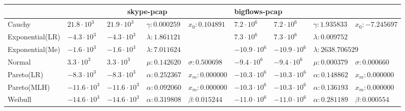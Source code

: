 \begin{table}[h!]
{\begin{tabular}{lllllllll}
				& \multicolumn{4}{c}{skype-pcap}                                        & \multicolumn{4}{l}{bigflows-pcap}                                       \\ \hline
Cauchy          & $ 21.8\cdot10^3 $  & $21.9\cdot10^3$  & $\gamma:0.000259 $ & $x_0:0.104891 $    & $ 7.2\cdot10^6 $   & $7.2\cdot10^6$   & $ \gamma:1.935833 $ & $x_0:-7.245697 $    \\
Exponential(LR) & $-4.3\cdot10^3$  & $ -4.3\cdot10^3 $  & \multicolumn{2}{l}{$\lambda:1.861121 $}   & $7.3\cdot10^6$   & $7.3\cdot10^6$   & \multicolumn{2}{l}{$ \lambda:0.009752 $}    \\
Exponential(Me) & $-1.6\cdot10^3$  & $-1.6\cdot10^3$  & \multicolumn{2}{l}{$\lambda:7.011624 $}   & $-10.9\cdot10^6$ & $-10.9\cdot10^6$ & \multicolumn{2}{l}{$ \lambda:2638.706529 $} \\
Normal          & $3.3\cdot10^3$   & $3.3\cdot10^3$   & $\mu:0.142620 $    & $\sigma:0.500698 $ & $-9.4\cdot10^6$  & $-9.4\cdot10^6$  & $ \mu:0.000379$     & $ \sigma:0.000660 $ \\
Pareto(LR)      & $-8.3\cdot10^3$  & $-8.3\cdot10^3$  & $\alpha:0.252367 $ & $x_m:0.000000 $    & $-10.3\cdot10^6$  & $-10.3\cdot10^6$  & $ \alpha:0.148862 $ & $ x_m:0.000000 $    \\
Pareto(MLH)     & $-11.6\cdot10^3$ & $-11.6\cdot10^3$ & $\alpha:0.092060 $ & $x_m:0.000000 $    & $-10.3\cdot10^6$  & $-10.3\cdot10^6$  & $ \alpha:0.136193 $ & $ x_m:0.000000 $    \\
Weibull         & $-14.6\cdot10^3$ & $-14.6\cdot10^3$ & $\alpha:0.319808 $ & $\beta:0.015244 $  & $-11.0\cdot10^6$ & $-11.0\cdot10^6$ & $ \alpha:0.281189 $ & $ \beta:0.000554 $  \\ \hline

\end{tabular}
}
\end{table}


